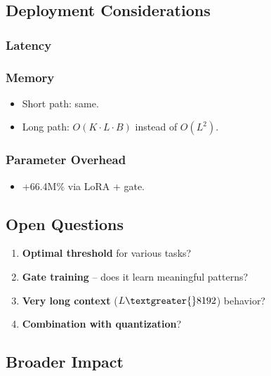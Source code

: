 \subsection{Deployment Considerations}

\subsubsection{Latency}
\subsubsection{Memory}
\begin{itemize}
\item Short path: same.
\item Long path: $O(K \cdot L \cdot B)$ instead of $O(L^2)$.

\end{itemize}
\subsubsection{Parameter Overhead}
\begin{itemize}
\item +66.4M\% via LoRA + gate.

\end{itemize}
\subsection{Open Questions}

\begin{enumerate}
\item \textbf{Optimal threshold} for various tasks?
\item \textbf{Gate training} -- does it learn meaningful patterns?
\item \textbf{Very long context} ($L \textgreater{} 8192$) behavior?
\item \textbf{Combination with quantization}?

\end{enumerate}
\subsection{Broader Impact}

